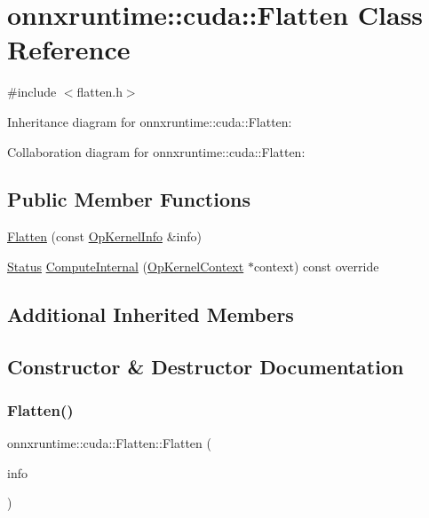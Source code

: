 \hypertarget{classonnxruntime_1_1cuda_1_1Flatten}{}\section{onnxruntime\+:\+:cuda\+:\+:Flatten Class Reference}
\label{classonnxruntime_1_1cuda_1_1Flatten}


{\ttfamily \#include $<$flatten.\+h$>$}



Inheritance diagram for onnxruntime\+:\+:cuda\+:\+:Flatten\+:


Collaboration diagram for onnxruntime\+:\+:cuda\+:\+:Flatten\+:
\subsection*{Public Member Functions}
\begin{DoxyCompactItemize}
\item 
\mbox{\hyperlink{classonnxruntime_1_1cuda_1_1Flatten_afb6b415fa7261e8002a6c2301abe898e}{Flatten}} (const \mbox{\hyperlink{classonnxruntime_1_1OpKernelInfo}{Op\+Kernel\+Info}} \&info)
\item 
\mbox{\hyperlink{classonnxruntime_1_1common_1_1Status}{Status}} \mbox{\hyperlink{classonnxruntime_1_1cuda_1_1Flatten_a823c3704fe7024e37a3c590c3adc3bf8}{Compute\+Internal}} (\mbox{\hyperlink{classonnxruntime_1_1OpKernelContext}{Op\+Kernel\+Context}} $\ast$context) const override
\end{DoxyCompactItemize}
\subsection*{Additional Inherited Members}


\subsection{Constructor \& Destructor Documentation}
\mbox{\label{classonnxruntime_1_1cuda_1_1Flatten_afb6b415fa7261e8002a6c2301abe898e}} 
\subsubsection{\texorpdfstring{Flatten()}{Flatten()}}
{\footnotesize\ttfamily onnxruntime\+::cuda\+::\+Flatten\+::\+Flatten (\begin{DoxyParamCaption}\item[{const \mbox{\hyperlink{classonnxruntime_1_1OpKernelInfo}{Op\+Kernel\+Info}} \&}]{info }\end{DoxyParamCaption})\hspace{0.3cm}{\ttfamily [inline]}}



